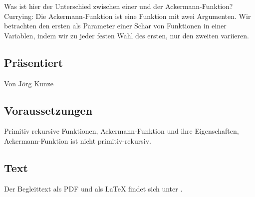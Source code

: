 \documentclass[a4paper]{amsart}
\theoremstyle{definition}
\begin{document}
Was ist hier der Unterschied zwischen einer und der Ackermann-Funktion? Currying: Die Ackermann-Funktion ist eine Funktion mit zwei Argumenten. Wir betrachten den ersten als Parameter einer Schar von Funktionen in einer Variablen, indem wir zu jeder festen Wahl des ersten, nur den zweiten variieren.  

\subsection*{Präsentiert}
Von Jörg Kunze

\subsection*{Voraussetzungen}
Primitiv rekursive Funktionen, Ackermann-Funktion und ihre Eigenschaften, Ackermann-Funktion ist nicht primitiv-rekursiv.

\subsection*{Text}
Der Begleittext als PDF und als LaTeX findet sich unter
\url{}.

\end{document}
